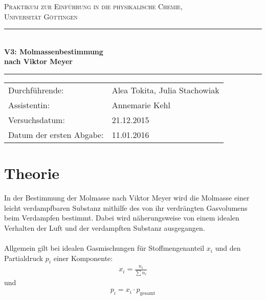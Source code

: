 \documentclass[12pt,a4paper,titlepage,headinclude,bibtotoc]{scrartcl}
\begin{document}
\begin{titlepage}
\centering
\textsc{\Large Praktikum zur Einführung in die physikalische Chemie,\\[1.5ex] Universität Göttingen}

\vspace*{2cm}

\rule{\textwidth}{1pt}\\[0.5cm]
{\huge \bfseries
  V3: Molmassenbestimmung\\[1.5ex]
  nach Viktor Meyer}\\[0.5cm]
\rule{\textwidth}{1pt}

\vspace*{1cm}


\begin{Large}
\begin{tabular}{ll}
Durchführende: &  Alea Tokita, Julia Stachowiak\\
Assistentin: & Annemarie Kehl\\
 Versuchsdatum: & 21.12.2015\\
 Datum der ersten Abgabe: & 11.01.2016
\end{tabular}
\end{Large}

\vspace*{2cm}

\begin{Large}
\end{Large}

\end{titlepage}

\tableofcontents

\newpage
\section{Theorie}
In der Bestimmung der Molmasse nach Viktor Meyer wird die Molmasse einer leicht verdampfbaren Substanz mithilfe des von ihr verdrängten Gasvolumens beim Verdampfen bestimmt. Dabei wird näherungsweise von einem idealen Verhalten der Luft und der verdampften Substanz ausgegangen.\\\\
Allgemein gilt bei idealen Gasmischungen für Stoffmengenanteil $x_i$ und den Partialdruck $p_i$ einer Komponente: 
\begin{align}
x_i = \frac{n_i}{\sum n_i}
\end{align}
und
\begin{align}
p_i = x_i \cdot p_{\mathrm{gesamt}}
\end{align}\\\\
\end{document}
